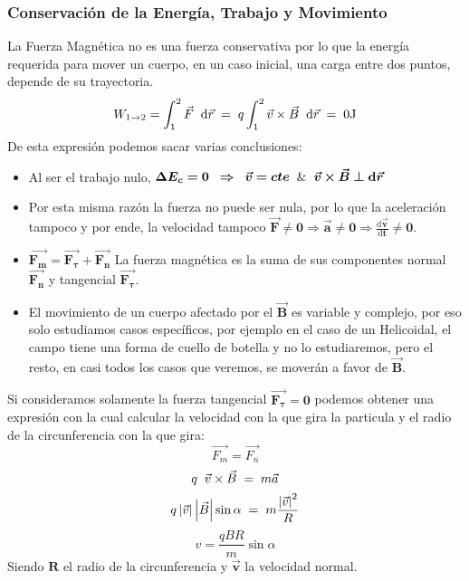 \subsubsection{Conservación de la Energía, Trabajo y Movimiento}
\noindent La Fuerza Magnética no es una fuerza conservativa por lo que la energía requerida para mover un cuerpo, en un caso inicial, una carga entre dos puntos, depende de su trayectoria.
\[
        W_{1 \rightarrow 2}= \int^2_1\vec{F}\hspace{2mm}\mathrm{d}\vec{r} \hspace{1mm}=\hspace{1mm} q\int^2_1\vec{v}\times\vec{B}\hspace{2mm}\mathrm{d}\vec{r}\hspace{1mm}=\hspace{1mm}0 \textnormal{J}
\]
\noindent De esta expresión podemos sacar varias conclusiones:
\begin{itemize}
        \item Al ser el trabajo nulo, \(\bm{\Delta E_c = 0} \hspace{2mm}\bm{\Rightarrow}\hspace{2mm}\bm{\vec{v}=cte} \hspace{2mm}\bm{\textnormal{\&}}\hspace{2mm} \bm{\vec{v}\times\vec{B}\perp\mathrm{d}\vec{r}}\)
        \item Por esta misma razón la fuerza no puede ser nula, por lo que la aceleración tampoco y por ende, la velocidad tampoco \(\bm{\vec{F}\not =0 \Rightarrow\vec{a}\not=0\Rightarrow\frac{\mathrm{d}\vec{v}}{\mathrm{d}t} \not=0}\).
        \item \(\bm{\vec{F_m} = \vec{F_\tau}+\vec{F_n}}\) La fuerza magnética es la suma de sus componentes normal \(\bm{\vec{F_n}}\) y tangencial \(\bm{\vec{F_\tau}}\).
        \item El movimiento de un cuerpo afectado por el \(\bm{\vec{B}}\) es variable y complejo, por eso solo estudiamos casos específicos, por ejemplo en el caso de un Helicoidal, el campo tiene una forma de cuello de botella y no lo estudiaremos, pero el resto, en casi todos los casos que veremos, se moverán a favor de \(\bm{\vec{B}}\).
\end{itemize}
\noindent Si consideramos solamente la fuerza tangencial \(\bm{\vec{F_{\tau}}=0}\) podemos obtener una expresión con la cual calcular la velocidad con la que gira la particula y el radio de la circunferencia con la que gira:
\[
        \vec{F_m} = \vec{F_n}
\]
\[
        q\hspace{2mm} \vec{v} \times \vec{B} \hspace{1mm} = \hspace{1mm} m\vec{a}
\]
\[
        q\left | \vec{v} \right |\left | \vec{B} \right |\sin{\alpha} \hspace{1mm} = \hspace{1mm} m\frac{\left | \vec{v} \right |^2}{R}
\]
\[
        \boxed{v = \frac{qBR}{m}\sin{\alpha}}
\]
Siendo \(\bm{R}\) el radio de la circunferencia y \(\bm{\vec{v}}\) la velocidad normal.

